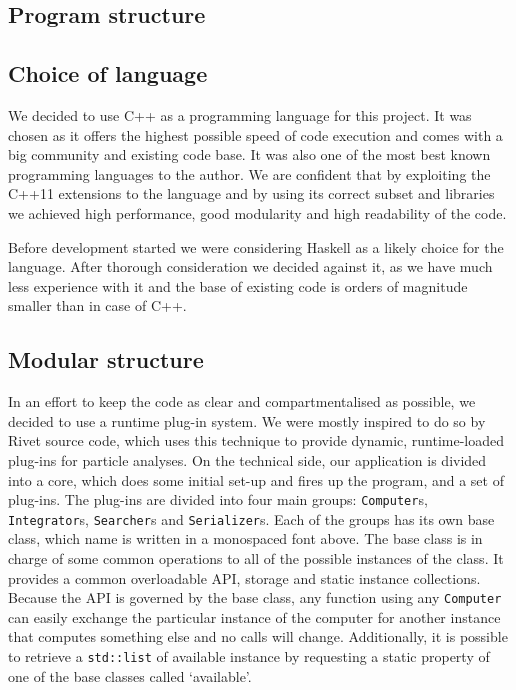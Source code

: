 \documentclass[11pt,a4paper]{article}
\begin{document}



\newpage
\begin{appendices}
    \section{Program structure}
    \subsection{Choice of language}
    We decided to use C++ as a programming language for this project.
    It was chosen as it offers the highest possible speed of code execution and comes with a big community and existing code base.
    It was also one of the most best known programming languages to the author.
    We are confident that by exploiting the C++11 extensions to the language and by using its correct subset and libraries we achieved high performance, good modularity and high readability of the code.

    Before development started we were considering Haskell as a likely choice for the language.
    After thorough consideration we decided against it, as we have much less experience with it and the base of existing code is orders of magnitude smaller than in case of C++.

    \subsection{Modular structure}
    In an effort to keep the code as clear and compartmentalised as possible, we decided to use a runtime plug-in system.
    We were mostly inspired to do so by Rivet\cite{Rivet13} source code, which uses this technique to provide dynamic, runtime-loaded plug-ins for particle analyses.
    On the technical side, our application is divided into a core, which does some initial set-up and fires up the program, and a set of plug-ins.
    The plug-ins are divided into four main groups: \texttt{Computer}s, \texttt{Integrator}s, \texttt{Searcher}s and \texttt{Serializer}s.
    Each of the groups has its own base class, which name is written in a monospaced font above.
    The base class is in charge of some common operations to all of the possible instances of the class.
    It provides a common overloadable API, storage and static instance collections.
    Because the API is governed by the base class, any function using any \texttt{Computer} can easily exchange the particular instance of the computer for another instance that computes something else and no calls will change.
    Additionally, it is possible to retrieve a \texttt{std::list} of available instance by requesting a static property of one of the base classes called `available'.


\end{appendices}
\end{document}

